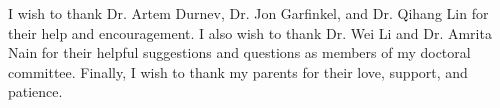 I wish to thank Dr. Artem Durnev, Dr. Jon Garfinkel, and Dr. Qihang Lin for their help and encouragement. I also wish to thank Dr. Wei Li and Dr. Amrita Nain for their helpful suggestions and questions as members of my doctoral committee. Finally, I wish to thank my parents for their love, support, and patience.